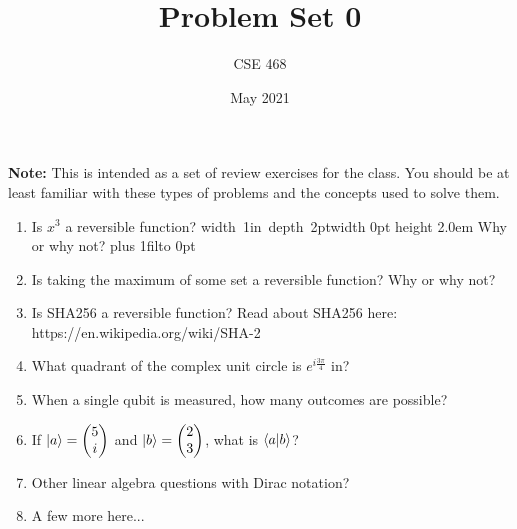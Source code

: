\documentclass[12pt]{article}
\title{Problem Set 0}
\author{CSE 468}
\date{May 2021}
\newcommand{\Blank}{\mbox{\vrule width 1in depth 2pt}\vrule width 0pt height 2.0em}
\def\LeaveSpace#1{%
\vskip #1 plus 1fil\relax\hbox to 0pt{\hss} %
}
\begin{document}
\maketitle

\noindent \textbf{Note:} This is intended as a set of review exercises for the class. You should be at least familiar with these types of problems and the concepts used to solve them.

\begin{enumerate}[font=\bfseries]
    \item Is $x^3$ a reversible function? \Blank{} Why or why not? \LeaveSpace{1in}
    \item Is taking the maximum of some set a reversible function?  Why or why not?
    \item Is SHA256 a reversible function? Read about SHA256 here: \newline https://en.wikipedia.org/wiki/SHA-2
    \item What quadrant of the complex unit circle is $e^{i\frac{3\pi}{4}}$ in?
    \item When a single qubit is measured, how many outcomes are possible?
    \item If $\ket{a} = \begin{pmatrix}5 \\ i \end{pmatrix}$ and $\ket{b} = \begin{pmatrix}2 \\ 3 \end{pmatrix}$, what is $\braket{a|b}$?
    \item Other linear algebra questions with Dirac notation?
    \item A few more here...
    
\end{enumerate}
\end{document}
